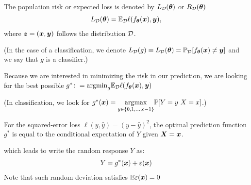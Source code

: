 \documentclass{beamer}
\begin{document}
\begin{frame}
  The population risk or expected loss is denoted by $L_{\mathcal{D}}(\bm{\theta})$ or $R_{\mathcal{D}}(\bm{\theta})$
  \begin{equation}
      L_{\mathcal{D}}(\bm{\theta}) =\mathbb{E}_{\mathcal{D}}\ell(f_{\bm{\theta}}(\bm{x}),\bm{y}),
  \end{equation}
  where $\bm{z}=(\bm{x},\bm{y})$ follows the distribution $\mathcal{D}$.
   
  (In the case of a classification, we denote $L_{\mathcal{D}}(g) \equiv L_{\mathcal{D}}(\bm{\theta}) = \mathbb{P}_{\mathcal{D}} [f_{\bm{\theta}}(\bm{x}) \neq \bm{y}]$ and we say that $g$ is a classifier.)

  Because we are interested in minimizing the risk in our prediction, we are looking for the best possible $g^* \colon = \mathrm{argmin}_g \mathbb{E}_{\mathcal{D}}\ell(f_{\bm{\theta}}(\bm{x}),\bm{y})$

  (In classification, we look for $g^* (\vx) = \underset{y\in\{0,1,\ldots,c-1\}}{\mathrm{argmax}}  \Prob[Y=y \ X=x]$.)

\end{frame}
  
\begin{frame}
  \begin{theorem}
    For the squared-error loss $\ell (y,\hat{y})=(y-\hat{y})^2$, the optimal prediction function $g^*$ is equal to the conditional expectation of $Y$ given $\bm{X}=\bm{x}$.
  \end{theorem}
  which leads to write the random response $Y$ as:
  \[Y=g^*(\bm{x})+\varepsilon(\bm{x})\]
  Note that such random deviation satisfies $\mathbb{E} \varepsilon(\bm{x})=0$
\end{frame}


\end{document}
